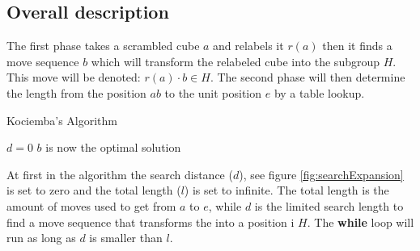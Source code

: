 \subsection{Overall description}
\label{sub:overallDescription}
The first phase takes a scrambled cube $a$ and relabels it $r(a)$ then it finds a move sequence $b$ which will transform the relabeled cube into the subgroup $H$. This move will be denoted: $r(a)\cdot{}b \in H$. The second phase will then determine the length from the position $ab$ to the unit position $e$ by a table lookup. 


\begin{algorithm}[!h]                     
\caption{Kociemba's Algorithm \cite{rokicki09}}          
\label{alg:kociemba}        
\begin{algorithmic}[1]
\STATE $d=0$
			\ENDIF
		\ENDIF
	\ENDFOR
\ENDWHILE
\STATE $b$ is now the optimal solution
\end{algorithmic}
\end{algorithm}

At first in the algorithm the search distance ($d$), see figure \ref{fig:searchExpansion} is set to zero and the total length ($l$) is set to infinite. The total length is the amount of moves used to get from $a$ to $e$, while $d$ is the limited search length to find a move sequence that transforms the \rubik{} into a position i $H$. 
The \textbf{while} loop will run as long as $d$ is smaller than $l$.

